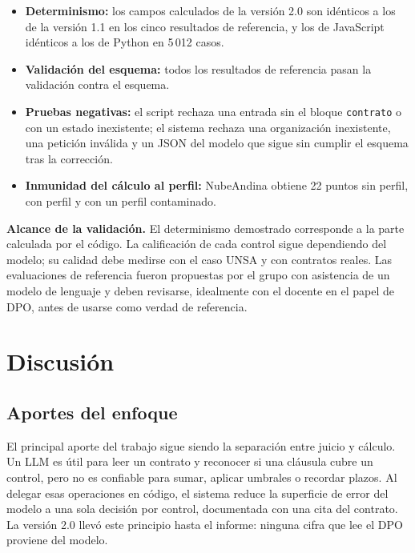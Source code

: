 \documentclass[12pt,letterpaper]{article}
\begin{document}
\begin{itemize}
  \item \textbf{Determinismo:} los campos calculados de la versión 2.0 son idénticos a los de la versión 1.1 en los cinco resultados de referencia, y los de JavaScript idénticos a los de Python en 5\,012 casos.
  \item \textbf{Validación del esquema:} todos los resultados de referencia pasan la validación contra el esquema.
  \item \textbf{Pruebas negativas:} el script rechaza una entrada sin el bloque \texttt{contrato} o con un estado inexistente; el sistema rechaza una organización inexistente, una petición inválida y un JSON del modelo que sigue sin cumplir el esquema tras la corrección.
  \item \textbf{Inmunidad del cálculo al perfil:} NubeAndina obtiene 22 puntos sin perfil, con perfil y con un perfil contaminado.
\end{itemize}

\par\noindent \textbf{Alcance de la validación.} El determinismo demostrado corresponde a la parte calculada por el código. La calificación de cada control sigue dependiendo del modelo; su calidad debe medirse con el caso UNSA y con contratos reales. Las evaluaciones de referencia fueron propuestas por el grupo con asistencia de un modelo de lenguaje y deben revisarse, idealmente con el docente en el papel de DPO, antes de usarse como verdad de referencia.
\par

\newpage
\section{Discusión}

\subsection{Aportes del enfoque}

El principal aporte del trabajo sigue siendo la separación entre juicio y cálculo. Un LLM es útil para leer un contrato y reconocer si una cláusula cubre un control, pero no es confiable para sumar, aplicar umbrales o recordar plazos. Al delegar esas operaciones en código, el sistema reduce la superficie de error del modelo a una sola decisión por control, documentada con una cita del contrato. La versión 2.0 llevó este principio hasta el informe: ninguna cifra que lee el DPO proviene del modelo.
\end{document}
